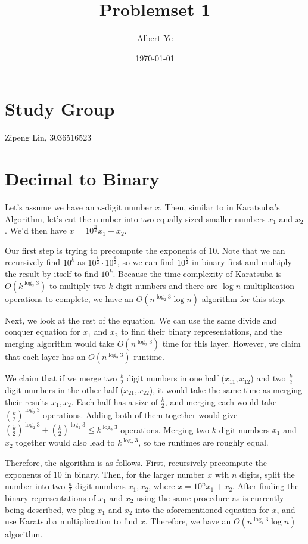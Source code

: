 \documentclass{article}
\title{Problemset 1}
\author{Albert Ye}
\date{\today}
\begin{document}
\maketitle
\section{Study Group}
Zipeng Lin, 3036516523

\section{Decimal to Binary}
Let's assume we have an $n$-digit number $x$. Then, similar to in Karatsuba's Algorithm, let's cut the number into two equally-sized smaller numbers $x_1$ and $x_2$. We'd then have $x = 10^{\frac{n}{2}} x_1 + x_2$. 

Our first step is trying to precompute the exponents of $10$. Note that we can recursively find $10^k$ as $10^{\frac{k}{2}} \cdot 10^{\frac{k}{2}}$, so we can find $10^{\frac{k}{2}}$ in binary first and multiply the result by itself to find $10^k$. Because the time complexity of Karatsuba is $O(k^{\log_2 3})$ to multiply two $k$-digit numbers and there are $\log n$ multiplication operations to complete, we have an $O(n^{\log_2 3} \log n)$ algorithm for this step.

Next, we look at the rest of the equation. We can use the same divide and conquer equation for $x_1$ and $x_2$ to find their binary representations, and the merging algorithm would take $O(n^{\log_2 3})$ time for this layer. However, we claim that each layer has an $O(n^{\log_2 3})$ runtime.

We claim that if we merge two $\frac{k}{2}$ digit numbers in one half ($x_{11}, x_{12}$) and two $\frac{k}{2}$ digit numbers in the other half ($x_{21}, x_{22}$), it would take the same time as merging their results $x_1, x_2$. Each half has a size of $\frac{k}{2}$, and merging each would take $(\frac{k}{2})^{\log_2 3}$ operations. Adding both of them together would give $\left(\frac{k}{2}\right)^{\log_2 3} + \left(\frac{k}{2}\right)^{\log_2 3} \leq k^{\log_2 3}$ operations. Merging two $k$-digit numbers $x_1$ and $x_2$ together would also lead to $k^{\log_2 3}$, so the runtimes are roughly equal.

Therefore, the algorithm is as follows. First, recursively precompute the exponents of $10$ in binary. Then, for the larger number $x$ wth $n$ digits, split the number into two $\frac{n}{2}$-digit numbers $x_1, x_2$, where $x = 10^{n}x_1 + x_2$. After finding the binary representations of $x_1$ and $x_2$ using the same procedure as is currently being described, we plug $x_1$ and $x_2$ into the aforementioned equation for $x$, and use Karatsuba multiplication to find $x$. Therefore, we have an $O(n^{\log_2 3} \log n)$ algorithm.
\end{document}
